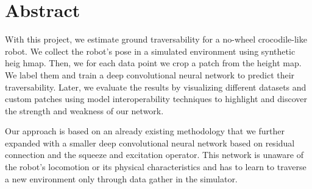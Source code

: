 \documentclass[../document.tex]{subfiles}
\begin{document}
\section{Abstract}
With this project, we estimate ground traversability for a no-wheel crocodile-like robot. We collect the robot's pose in a simulated environment using synthetic heig hmap. Then, we for each data point we crop a patch from the height map. We label them and train a deep convolutional neural network to predict their traversability.
Later, we evaluate the results by visualizing different datasets and custom patches using model interoperability techniques to highlight and discover the strength and weakness of our network.

Our approach is based on 
an already existing methodology that we further expanded with a smaller deep convolutional neural network based on residual connection and the squeeze and excitation operator.
This network is unaware of the robot's locomotion or its physical characteristics and has to learn to traverse a new environment only through data gather in the simulator.

\end{document}
